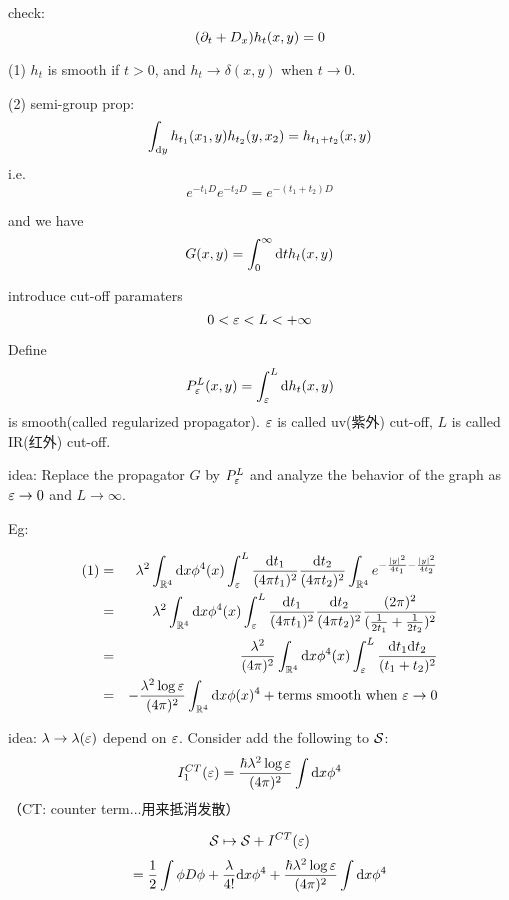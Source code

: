 check:
$$(\partial_t+D_x)h_t(x,y)=0$$

\begin{prop}

(1) $h_t$ is smooth if $t>0$, and $h_t\to\delta(x,y)$ when $t\to 0$.

(2) semi-group prop:
$$\int_{\mathrm{d} y}h_{t_1}(x_1,y)h_{t_2}(y,x_2)=h_{t_1+t_2}(x,y)$$
i.e.
$$e^{-t_1 D}e^{-t_2D}=e^{-(t_1+t_2)D}$$
\end{prop}

and we have
$$G(x,y)=\int_0^\infty \mathrm{d} t h_t(x,y)$$

introduce cut-off paramaters
$$0<\varepsilon<L<+\infty$$

Define
$$P^L_{\varepsilon}(x,y)=\int_\varepsilon^L\mathrm{d} h_t(x,y)$$
is smooth(called regularized propagator).
$\varepsilon$ is called uv(紫外) cut-off,
$L$ is  called IR(红外) cut-off.

idea: Replace the propagator $G$ by $P^L_\varepsilon$
and analyze the behavior of the graph as $\varepsilon\to 0$ and $L\to\infty$.

Eg:


\begin{eqnarray*}
     (1)
&=&
     \lambda^2\int_{\mathbb{R}^4}
       \mathrm{d} x\phi^4(x)
         \int_\varepsilon^L
           \frac{\mathrm{d} t_1}{(4\pi t_1)^2}
           \frac{\mathrm{d} t_2}{(4\pi t_2)^2}
             \int_{\mathbb{R}^4}
               e^{-\frac{|y|^2}{4t_1}-\frac{|y|^2}{4t_2}}\\
&=&
     \lambda^2\int_{\mathbb{R}^4}
       \mathrm{d} x\phi^4(x)
         \int_\varepsilon^L
           \frac{\mathrm{d} t_1}{(4\pi t_1)^2}
           \frac{\mathrm{d} t_2}{(4\pi t_2)^2}
           \frac{(2\pi)^2}{(\frac{1}{2t_1}+\frac{1}{2t_2})^2}\\
&=&
     \frac{\lambda^2}{(4\pi)^2}
     \int_{\mathbb{R}^4}
       \mathrm{d} x\phi^4(x)
       \int_\varepsilon^L
         \frac{\mathrm{d} t_1\mathrm{d} t_2}{(t_1+t_2)^2}\\
&=&
     -\frac{\lambda^2\log\varepsilon}{(4\pi)^2}
     \int_{\mathbb{R}^4}\mathrm{d} x \phi(x)^4
     +\text{terms smooth when $\varepsilon\to 0$}
\end{eqnarray*}

idea: $\lambda\to\lambda(\varepsilon)$ depend on $\varepsilon$.
Consider add the following to $\mathcal{S}$:
$$I^{CT}_1(\varepsilon)=\frac{\hbar\lambda^2\log\varepsilon}{(4\pi)^2}\int\mathrm{d} x\phi^4$$
（CT: counter term...用来抵消发散）

$$\mathcal{S}\mapsto\mathcal{S}+I^{CT}(\varepsilon)$$
$$=\frac{1}{2}\int\phi D\phi+\frac{\lambda}{4!}\mathrm{d} x\phi^4+
\frac{\hbar\lambda^2\log\varepsilon}{(4\pi)^2}\int\mathrm{d} x\phi^4$$

